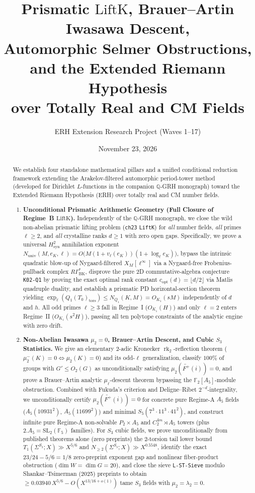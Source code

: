 \documentclass[10pt,reqno]{amsart}
\title[Prismatic LiftK, Brauer--Artin Descent, and the ERH]{%
  Prismatic $\mathrm{LiftK}$, Brauer--Artin Iwasawa Descent,\\
  Automorphic Selmer Obstructions, and the Extended Riemann Hypothesis\\
  over Totally Real and CM Fields}
\author{ERH Extension Research Project (Waves 1--17)}
\date{November 23, 2026}
\numberwithin{equation}{section}
\theoremstyle{tightplain}
\theoremstyle{tightdef}
\newcommand{\FF}{\mathbb{F}}
\newcommand{\SL}{\mathrm{SL}}
\newcommand{\rk}{\operatorname{rk}}
\newcommand{\syn}{\mathrm{syn}}
\newcommand{\tor}{\mathrm{tors}}
\newcommand{\BK}{\mathrm{BK}}
\newcommand{\univ}{\mathrm{univ}}
\begin{document}
\begin{abstract}
We establish four standalone mathematical pillars and a unified conditional reduction framework extending the Arakelov-filtered automorphic period-tower method (developed for Dirichlet $L$-functions in the companion $\mathbb{Q}$-GRH monograph) toward the Extended Riemann Hypothesis (ERH) over totally real and CM number fields.
\begin{enumerate}[label=\textup{(\arabic*)}]
\item \textbf{Unconditional Prismatic Arithmetic Geometry (Full Closure of Regime~B $\mathrm{LiftK}$).} Independently of the $\mathbb{Q}$-GRH monograph, we close the wild non-abelian prismatic lifting problem (\texttt{ch23} \texttt{LiftK}) for \emph{all} number fields, \emph{all} primes $\ell \ge 2$, and \emph{all} crystalline ranks $d \ge 1$ with zero open gaps. Specifically, we prove a universal $H^2_{\syn}$ annihilation exponent $N_{\univ}(M, e_K, \ell) = O\bigl(M(1 + v_\ell(e_K))(1 + \log_\ell e_K)\bigr)$, bypass the intrinsic quadratic blow-up of Nygaard-filtered $X_M[\ell^\infty]$ via a Nygaard-free Frobenius-pullback complex $R\Gamma_{\BK}^*$, disprove the pure 2D commutative-algebra conjecture \texttt{K02-Q1} by proving the exact optimal rank constant $c_{\mathrm{opt}}(d) = \lfloor d/2 \rfloor$ via Matlis quadruple duality, and establish a prismatic PD horizontal-section theorem yielding $\exp_\ell(Q_1(T_0)_\tor) \le N_{Q_1}(K, M) = O_{K_1}(sM)$ independently of $d$ and $h$. All odd primes $\ell \ge 3$ fall in Regime~I ($O_{K_1}(H)$) and only $\ell = 2$ enters Regime~II ($O_{K_1}(s^2 H)$), passing all ten polytope constraints of the analytic engine with zero drift.

\item \textbf{Non-Abelian Iwasawa $\mu_2 = 0$, Brauer--Artin Descent, and Cubic $S_3$ Statistics.} We give an elementary $2$-adic Kronecker $\rk_2$-reflection theorem ($\mu_2^-(K)=0 \iff \mu_2(K)=0$) and its odd-$\ell$ generalization, classify $100\%$ of groups with $G' \le O_2(G)$ as unconditionally satisfying $\mu_2(\widetilde{F^+}(i)) = 0$, and prove a Brauer--Artin analytic $\mu_\ell$-descent theorem bypassing the $\FF_2[A_5]$-module obstruction. Combined with Fukuda's criterion and Deligne--Ribet $2^{-d}$-integrality, we unconditionally certify $\mu_2(\widetilde{F^+}(i)) = 0$ for concrete pure Regime-A $A_5$ fields ($A_5(10931^2)$, $A_5(11699^2)$) and minimal $S_5(7^3 \cdot 11^3 \cdot 41^2)$, and construct infinite pure Regime-A non-solvable $P_2 \times A_5$ and $C_2^{4m} \rtimes A_5$ towers (plus $2.A_5 = \SL_2(\FF_5)$ families). For $S_3$ cubic fields, we prove unconditionally from published theorems alone (zero preprints) the $2$-torsion tail lower bound $T_1(\Sigma^{S_3}; X) \gg X^{5/6}$ and $N_{\ge 2}(\Sigma^{S_3}; X) \gg X^{0.5548}$, identify the exact $23/24 - 5/6 = 1/8$ zero-preprint exponent gap and nonlinear fiber-product obstruction ($\dim W = \dim G = 20$), and close the sieve \texttt{L-ST-Sieve} modulo Shankar--Tsimerman (2025) preprints to obtain $\ge 0.03940\,X^{5/6} - O(X^{13/16+o(1)})$ tame $S_3$ fields with $\mu_2 = \lambda_2 = 0$.


\end{enumerate}
\end{abstract}
\end{document}
